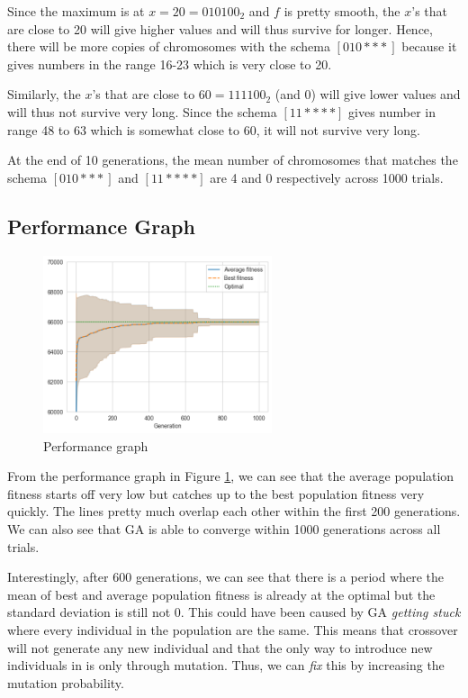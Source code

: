 Since the maximum is at \(x = 20 = 010100_2\) and \(f\) is pretty smooth, the \(x\)'s that are close to 20 will give higher values and will thus survive for longer. Hence, there will be more copies of chromosomes with the schema \([010{{}***{}}]\) because it gives numbers in the range 16-23 which is very close to 20.

Similarly, the \(x\)'s that are close to \(60 = 111100_2\) (and 0) will give lower values and will thus not survive very long. Since the schema \([11{{}****{}}]\) gives number in range 48 to 63 which is somewhat close to 60, it will not survive very long.

At the end of 10 generations, the mean number of chromosomes that matches the schema \([010{{}***{}}]\) and \([11{{}****{}}]\) are 4 and 0 respectively across 1000 trials.

\subsection{Performance Graph}

\begin{figure}[ht]
    \centering
    \includegraphics[width=0.6\textwidth]{../images/p2/part4.png}
    \caption{Performance graph}
    \label{fig:p4-4}
\end{figure}

From the performance graph in Figure \ref{fig:p4-4}, we can see that the average population fitness starts off very low but catches up to the best population fitness very quickly. The lines pretty much overlap each other within the first 200 generations. We can also see that GA is able to converge within 1000 generations across all trials.

Interestingly, after 600 generations, we can see that there is a period where the mean of best and average population fitness is already at the optimal but the standard deviation is still not 0. This could have been caused by GA \textit{getting stuck} where every individual in the population are the same. This means that crossover will not generate any new individual and that the only way to introduce new individuals in is only through mutation. Thus, we can \textit{fix} this by increasing the mutation probability.

